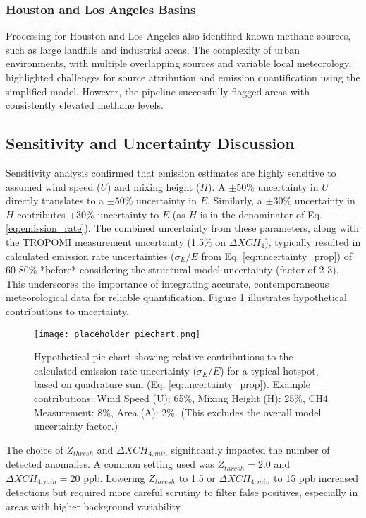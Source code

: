 \documentclass[12pt,a4paper]{article}
\begin{document}
\subsubsection{Houston and Los Angeles Basins}
Processing for Houston and Los Angeles also identified known methane sources, such as large landfills and industrial areas. The complexity of urban environments, with multiple overlapping sources and variable local meteorology, highlighted challenges for source attribution and emission quantification using the simplified model. However, the pipeline successfully flagged areas with consistently elevated methane levels.

\subsection{Sensitivity and Uncertainty Discussion}
Sensitivity analysis confirmed that emission estimates are highly sensitive to assumed wind speed ($U$) and mixing height ($H$). A $\pm 50\%$ uncertainty in $U$ directly translates to a $\pm 50\%$ uncertainty in $E$. Similarly, a $\pm 30\%$ uncertainty in $H$ contributes $\mp 30\%$ uncertainty to $E$ (as $H$ is in the denominator of Eq. \ref{eq:emission_rate}).
The combined uncertainty from these parameters, along with the TROPOMI measurement uncertainty (1.5\% on $\Delta XCH_4$), typically resulted in calculated emission rate uncertainties ($\sigma_E/E$ from Eq. \ref{eq:uncertainty_prop}) of 60-80\% *before* considering the structural model uncertainty (factor of 2-3). This underscores the importance of integrating accurate, contemporaneous meteorological data for reliable quantification. Figure \ref{fig:uncertainty_contrib} illustrates hypothetical contributions to uncertainty.

\begin{figure}[H]
    \centering
    \texttt{[image: placeholder\_piechart.png]} %
    \caption{Hypothetical pie chart showing relative contributions to the calculated emission rate uncertainty ($\sigma_E/E$) for a typical hotspot, based on quadrature sum (Eq. \ref{eq:uncertainty_prop}). Example contributions: Wind Speed (U): 65\%, Mixing Height (H): 25\%, CH4 Measurement: 8\%, Area (A): 2\%. (This excludes the overall model uncertainty factor.)}
    \label{fig:uncertainty_contrib}
\end{figure}

The choice of $Z_{thresh}$ and $\Delta XCH_{4,min}$ significantly impacted the number of detected anomalies. A common setting used was $Z_{thresh}=2.0$ and $\Delta XCH_{4,min}=20$ ppb. Lowering $Z_{thresh}$ to 1.5 or $\Delta XCH_{4,min}$ to 15 ppb increased detections but required more careful scrutiny to filter false positives, especially in areas with higher background variability.
\end{document}
